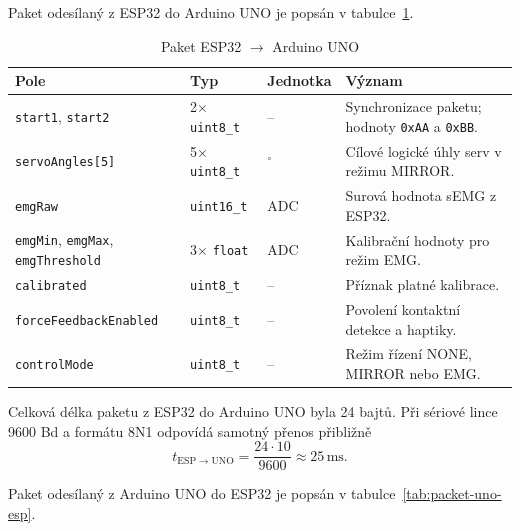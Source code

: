 Paket odesílaný z ESP32 do Arduino UNO je popsán v tabulce~\ref{tab:packet-esp-uno}.

\begin{table}[htbp]
\centering
\caption{Paket ESP32 $\rightarrow$ Arduino UNO}
\label{tab:packet-esp-uno}
\begin{tabular}{|p{}|p{}|p{}|p{}|}
\hline
\textbf{Pole} & \textbf{Typ} & \textbf{Jednotka} & \textbf{Význam} \\
\hline
\texttt{start1}, \texttt{start2} & 2$\times$ \texttt{uint8\_t} & -- & Synchronizace paketu; hodnoty \texttt{0xAA} a \texttt{0xBB}. \\
\hline
\texttt{servoAngles[5]} & 5$\times$ \texttt{uint8\_t} & $^\circ$ & Cílové logické úhly serv v režimu MIRROR\@. \\
\hline
\texttt{emgRaw} & \texttt{uint16\_t} & ADC & Surová hodnota sEMG z ESP32. \\
\hline
\texttt{emgMin}, \texttt{emgMax}, \texttt{emgThreshold} & 3$\times$ \texttt{float} & ADC & Kalibrační hodnoty pro režim EMG\@. \\
\hline
\texttt{calibrated} & \texttt{uint8\_t} & -- & Příznak platné kalibrace. \\
\hline
\texttt{forceFeedbackEnabled} & \texttt{uint8\_t} & -- & Povolení kontaktní detekce a haptiky. \\
\hline
\texttt{controlMode} & \texttt{uint8\_t} & -- & Režim řízení NONE, MIRROR nebo EMG\@. \\
\hline
\end{tabular}
\end{table}

Celková délka paketu z ESP32 do Arduino UNO byla 24 bajtů. Při sériové lince 9600 Bd a formátu 8N1 odpovídá samotný přenos přibližně
\begin{equation}
    t_{\mathrm{ESP}\rightarrow\mathrm{UNO}} =
    \frac{24 \cdot 10}{9600}
    \approx 25\,\mathrm{ms}.
\end{equation}

Paket odesílaný z Arduino UNO do ESP32 je popsán v tabulce~\ref{tab:packet-uno-esp}.

